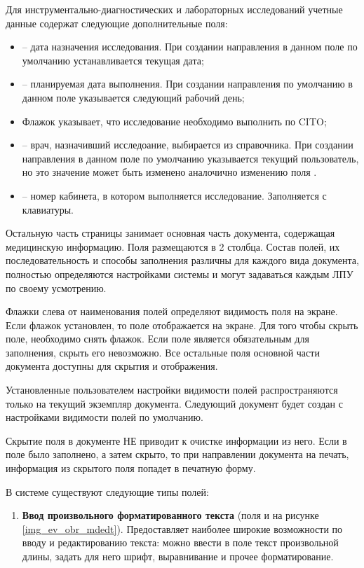 {Для инструментально-диагностических и лабораторных исследований учетные данные содержат следующие дополнительные поля: 
\begin{itemize}
 \item {} -- дата назначения исследования. При создании направления в данном поле по умолчанию устанавливается текущая дата;
 \item {} -- планируемая дата выполнения. При создании направления по умолчанию в данном поле указывается следующий рабочий день;
 \item Флажок  указывает, что исследование необходимо выполнить по CITO;
 \item {} -- врач, назначивший исследоание, выбирается из справочника. При создании направления в данном поле по умолчанию указывается текущий пользователь, но это значение может быть изменено аналочично изменению поля .
 \item {} -- номер кабинета, в котором выполняется исследование. Заполняется с клавиатуры. 
\end{itemize}

Остальную часть страницы занимает основная часть документа, содержащая медицинскую информацию. Поля размещаются в 2 столбца. Состав полей, их последовательность и способы заполнения различны для каждого вида документа, полностью определяются настройками системы и могут задаваться каждым ЛПУ по своему усмотрению.  

Флажки слева от наименования полей определяют видимость поля на экране. Если флажок установлен, то поле отображается на экране. Для того чтобы скрыть поле, необходимо снять флажок. Если поле является обязательным для заполнения, скрыть его невозможно. Все остальные поля основной части документа доступны для скрытия и отображения. 

\begin{prim}
Установленные пользователем настройки видимости полей распространяются только на текущий экземпляр документа. Следующий документ будет создан с настройками видимости полей по умолчанию.
\end{prim}

\begin{vnim}
Скрытие поля в документе НЕ приводит к очистке информации из него. Если в поле было заполнено, а затем скрыто, то при направлении документа на печать, информация из скрытого поля попадет в печатную форму. 
\end{vnim}

В системе существуют следующие типы полей:
\begin{enumerate}
 \item \textbf{Ввод произвольного форматированного текста} (поля  и  на рисунке \ref{img_ev_obr_mdedt}). Предоставляет наиболее широкие возможности по вводу и редактированию текста: можно ввести в поле текст произвольной длины, задать для него шрифт, выравнивание и прочее форматирование. 
 

\end{enumerate}}
